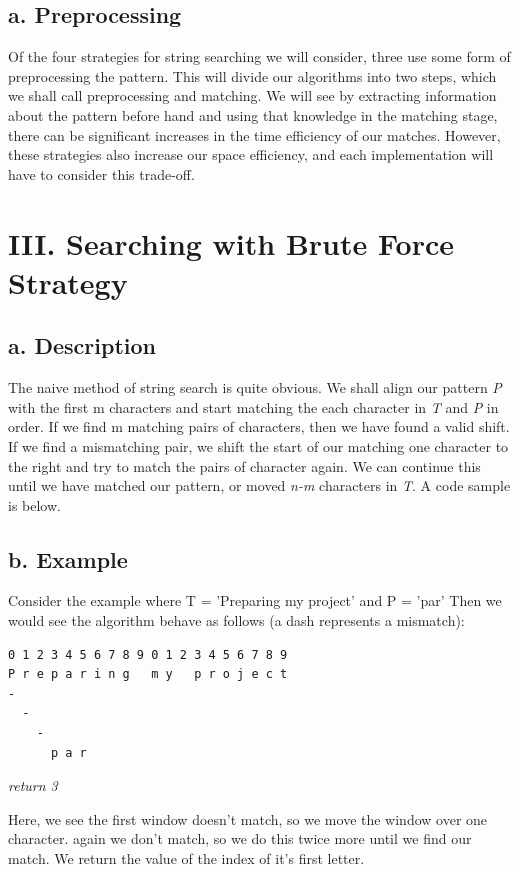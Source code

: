 \documentclass{chi2005}
\begin{document}
\subsection{a. Preprocessing}

Of the four strategies for string searching we will consider, three use some form of preprocessing the pattern. This will divide our algorithms into two steps, which we shall call preprocessing and matching. We will see by extracting information about the pattern before hand and using that knowledge in the matching stage, there can be significant increases in the time efficiency of our matches. However, these strategies also increase our space efficiency, and each implementation will have to consider this trade-off.

\section{III. Searching with Brute Force Strategy}

\subsection{a. Description}

The naive method of string search is quite obvious. We shall align our pattern \emph{P} with the first m characters and start matching the each character in \emph{T} and \emph{P} in order. If we find m matching pairs of characters, then we have found a valid shift. If we find a mismatching pair, we shift the start of our matching one character to the right and try to match the pairs of character again. We can continue this until we have matched our pattern, or moved \emph{n-m} characters in \emph{T}. A code sample is below.

\subsection{b. Example}

Consider the example where T = 'Preparing my project' and P = 'par' Then we would see the algorithm behave as follows (a dash represents a mismatch):

\begin{verbatim}
0 1 2 3 4 5 6 7 8 9 0 1 2 3 4 5 6 7 8 9
P r e p a r i n g   m y   p r o j e c t
-
  -
    -
      p a r
 \end{verbatim}
 
 \emph{return 3}
         
Here, we see the first window doesn't match, so we move the window over one character. again we don't match, so we  do this twice more until we find our match. We return the value of the index of it's first letter.
\end{document}
